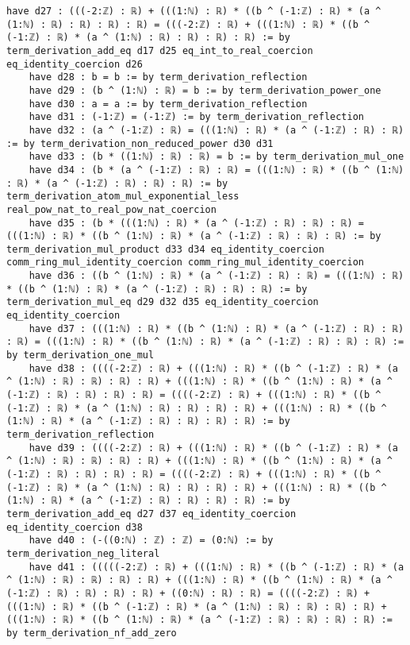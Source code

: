 \documentclass{article}
\begin{document}
\begin{tcolorbox}[colback=white!10, width=\linewidth]
\begin{lstlisting}[language=Lean4]
    have d27 : (((-2:ℤ) : ℝ) + (((1:ℕ) : ℝ) * ((b ^ (-1:ℤ) : ℝ) * (a ^ (1:ℕ) : ℝ) : ℝ) : ℝ) : ℝ) = (((-2:ℤ) : ℝ) + (((1:ℕ) : ℝ) * ((b ^ (-1:ℤ) : ℝ) * (a ^ (1:ℕ) : ℝ) : ℝ) : ℝ) : ℝ) := by term_derivation_add_eq d17 d25 eq_int_to_real_coercion eq_identity_coercion d26
    have d28 : b = b := by term_derivation_reflection
    have d29 : (b ^ (1:ℕ) : ℝ) = b := by term_derivation_power_one
    have d30 : a = a := by term_derivation_reflection
    have d31 : (-1:ℤ) = (-1:ℤ) := by term_derivation_reflection
    have d32 : (a ^ (-1:ℤ) : ℝ) = (((1:ℕ) : ℝ) * (a ^ (-1:ℤ) : ℝ) : ℝ) := by term_derivation_non_reduced_power d30 d31
    have d33 : (b * ((1:ℕ) : ℝ) : ℝ) = b := by term_derivation_mul_one
    have d34 : (b * (a ^ (-1:ℤ) : ℝ) : ℝ) = (((1:ℕ) : ℝ) * ((b ^ (1:ℕ) : ℝ) * (a ^ (-1:ℤ) : ℝ) : ℝ) : ℝ) := by term_derivation_atom_mul_exponential_less real_pow_nat_to_real_pow_nat_coercion
    have d35 : (b * (((1:ℕ) : ℝ) * (a ^ (-1:ℤ) : ℝ) : ℝ) : ℝ) = (((1:ℕ) : ℝ) * ((b ^ (1:ℕ) : ℝ) * (a ^ (-1:ℤ) : ℝ) : ℝ) : ℝ) := by term_derivation_mul_product d33 d34 eq_identity_coercion comm_ring_mul_identity_coercion comm_ring_mul_identity_coercion
    have d36 : ((b ^ (1:ℕ) : ℝ) * (a ^ (-1:ℤ) : ℝ) : ℝ) = (((1:ℕ) : ℝ) * ((b ^ (1:ℕ) : ℝ) * (a ^ (-1:ℤ) : ℝ) : ℝ) : ℝ) := by term_derivation_mul_eq d29 d32 d35 eq_identity_coercion eq_identity_coercion
    have d37 : (((1:ℕ) : ℝ) * ((b ^ (1:ℕ) : ℝ) * (a ^ (-1:ℤ) : ℝ) : ℝ) : ℝ) = (((1:ℕ) : ℝ) * ((b ^ (1:ℕ) : ℝ) * (a ^ (-1:ℤ) : ℝ) : ℝ) : ℝ) := by term_derivation_one_mul
    have d38 : ((((-2:ℤ) : ℝ) + (((1:ℕ) : ℝ) * ((b ^ (-1:ℤ) : ℝ) * (a ^ (1:ℕ) : ℝ) : ℝ) : ℝ) : ℝ) + (((1:ℕ) : ℝ) * ((b ^ (1:ℕ) : ℝ) * (a ^ (-1:ℤ) : ℝ) : ℝ) : ℝ) : ℝ) = ((((-2:ℤ) : ℝ) + (((1:ℕ) : ℝ) * ((b ^ (-1:ℤ) : ℝ) * (a ^ (1:ℕ) : ℝ) : ℝ) : ℝ) : ℝ) + (((1:ℕ) : ℝ) * ((b ^ (1:ℕ) : ℝ) * (a ^ (-1:ℤ) : ℝ) : ℝ) : ℝ) : ℝ) := by term_derivation_reflection
    have d39 : ((((-2:ℤ) : ℝ) + (((1:ℕ) : ℝ) * ((b ^ (-1:ℤ) : ℝ) * (a ^ (1:ℕ) : ℝ) : ℝ) : ℝ) : ℝ) + (((1:ℕ) : ℝ) * ((b ^ (1:ℕ) : ℝ) * (a ^ (-1:ℤ) : ℝ) : ℝ) : ℝ) : ℝ) = ((((-2:ℤ) : ℝ) + (((1:ℕ) : ℝ) * ((b ^ (-1:ℤ) : ℝ) * (a ^ (1:ℕ) : ℝ) : ℝ) : ℝ) : ℝ) + (((1:ℕ) : ℝ) * ((b ^ (1:ℕ) : ℝ) * (a ^ (-1:ℤ) : ℝ) : ℝ) : ℝ) : ℝ) := by term_derivation_add_eq d27 d37 eq_identity_coercion eq_identity_coercion d38
    have d40 : (-((0:ℕ) : ℤ) : ℤ) = (0:ℕ) := by term_derivation_neg_literal
    have d41 : (((((-2:ℤ) : ℝ) + (((1:ℕ) : ℝ) * ((b ^ (-1:ℤ) : ℝ) * (a ^ (1:ℕ) : ℝ) : ℝ) : ℝ) : ℝ) + (((1:ℕ) : ℝ) * ((b ^ (1:ℕ) : ℝ) * (a ^ (-1:ℤ) : ℝ) : ℝ) : ℝ) : ℝ) + ((0:ℕ) : ℝ) : ℝ) = ((((-2:ℤ) : ℝ) + (((1:ℕ) : ℝ) * ((b ^ (-1:ℤ) : ℝ) * (a ^ (1:ℕ) : ℝ) : ℝ) : ℝ) : ℝ) + (((1:ℕ) : ℝ) * ((b ^ (1:ℕ) : ℝ) * (a ^ (-1:ℤ) : ℝ) : ℝ) : ℝ) : ℝ) := by term_derivation_nf_add_zero

\end{lstlisting}
\end{tcolorbox}
\end{document}
